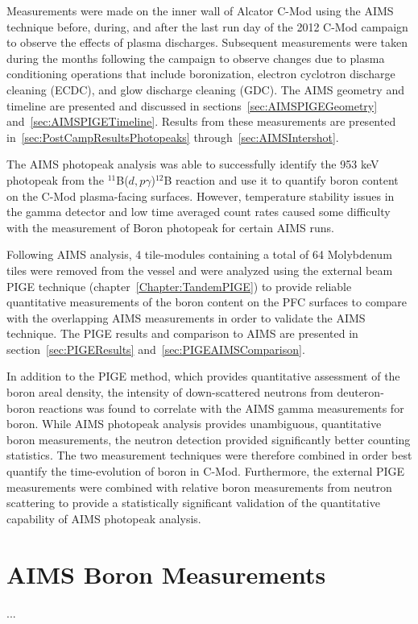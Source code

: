 \documentclass[11pt,a4paper,twocolumn]{article}
\begin{document}
Measurements were made on the inner wall of Alcator C-Mod using the AIMS technique before, during, and after the last run day of the 2012 C-Mod campaign to observe the effects of plasma discharges.  Subsequent measurements were taken during the months following the campaign to observe changes due to plasma conditioning operations that include boronization, electron cyclotron discharge cleaning (ECDC), and glow discharge cleaning (GDC).  The AIMS geometry and timeline are presented and discussed in sections~\ref{sec:AIMSPIGEGeometry} and~\ref{sec:AIMSPIGETimeline}.  Results from these measurements are presented in~\ref{sec:PostCampResultsPhotopeaks} through~\ref{sec:AIMSIntershot}.  

The AIMS photopeak analysis was able to successfully identify the 953 keV photopeak from the $^{11}$B($d,p\gamma$)$^{12}$B reaction and use it to quantify boron content on the C-Mod plasma-facing surfaces.  However, temperature stability issues in the gamma detector and low time averaged count rates caused some difficulty with the measurement of Boron photopeak for certain AIMS runs. 

Following AIMS analysis, 4 tile-modules containing a total of 64 Molybdenum tiles were removed from the vessel and were analyzed using the external beam PIGE technique (chapter~\ref{Chapter:TandemPIGE}) to provide reliable quantitative measurements of the boron content on the PFC surfaces to compare with the overlapping AIMS measurements in order to validate the AIMS technique.  The PIGE results and comparison to AIMS are presented in section~\ref{sec:PIGEResults} and~\ref{sec:PIGEAIMSComparison}.  

In addition to the PIGE method, which provides quantitative assessment of the boron areal density, the intensity of down-scattered neutrons from deuteron-boron reactions was found to correlate with the AIMS gamma measurements for boron.  While AIMS photopeak analysis provides unambiguous, quantitative boron measurements, the neutron detection provided significantly better counting statistics.  The two measurement techniques were therefore combined in order best quantify the time-evolution of boron in C-Mod.  Furthermore, the external PIGE measurements were combined with relative boron measurements from neutron scattering to provide a statistically significant validation of the quantitative capability of AIMS photopeak analysis.

\section{AIMS Boron Measurements}
...
\end{document}
